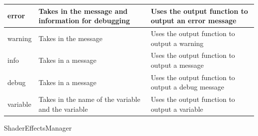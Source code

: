 \documentclass{article}
\begin{document}
\begin{center}
\begin{tabular}{ | m{} | m{}| m{} | }
                        \hline
                        error & Takes in the message and information for debugging & Uses the output function to output an error message \\
                        \hline
                        warning & Takes in the message & Uses the output function to output a warning \\
                        \hline
                        info & Takes in a message & Uses the output function to output a message \\
                        \hline
                        debug & Takes in a message & Uses the output function to output a debug message \\
                        \hline
                        variable & Takes in the name of the variable and the variable & Uses the output function to output a variable \\
                        \hline
                    \end{tabular}
                \end{center}
                ShaderEffectsManager
\end{document}
